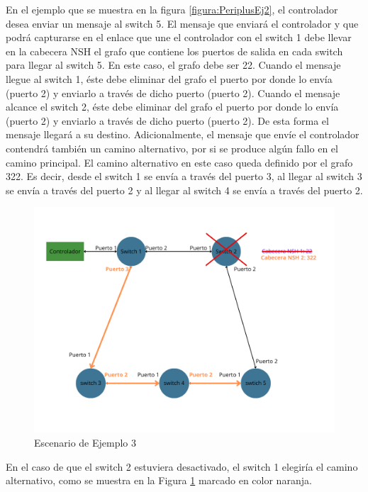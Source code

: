 \documentclass[a4paper, 12pt]{book}
\begin{document}
	En el ejemplo que se muestra en la figura \ref{figura:PeriplusEj2}, el controlador desea enviar un mensaje
	al switch 5. El mensaje que enviará el controlador y que podrá capturarse en el enlace que une el
	controlador con el switch 1 debe llevar en la cabecera NSH el grafo que contiene
	los puertos de salida en cada switch para llegar al switch 5. En este caso,
	el grafo debe ser 22. Cuando el mensaje llegue al switch 1, éste debe eliminar del
	grafo el puerto por donde lo envía (puerto 2) y
	enviarlo a través de dicho puerto (puerto 2). Cuando el mensaje alcance el
	switch 2, éste debe eliminar del grafo el puerto por donde lo envía (puerto 2) y enviarlo
	a través de dicho puerto (puerto 2). De esta forma el mensaje llegará a
	su destino.
	Adicionalmente, el mensaje que envíe el controlador contendrá también un camino alternativo,
	por si se produce algún fallo en el camino principal. El camino alternativo en este caso queda
	definido por el grafo 322. Es decir, desde el switch 1 se envía a través del puerto 3, al llegar al
	switch 3 se envía a través del puerto 2 y al llegar al switch 4 se envía a través del puerto 2.


	\begin{figure}[H]
		\centering
		\includegraphics[width=16cm, keepaspectratio]{img/Ejemplo Periplus 3}
		\caption{Escenario de Ejemplo 3}
		\label{figura:PeriplusEj3}
	\end{figure}
	
	En el caso de que el switch 2 estuviera desactivado, el switch 1 elegiría el camino alternativo, como se muestra en la Figura \ref{figura:PeriplusEj3} marcado en color naranja.
	
\end{document}
